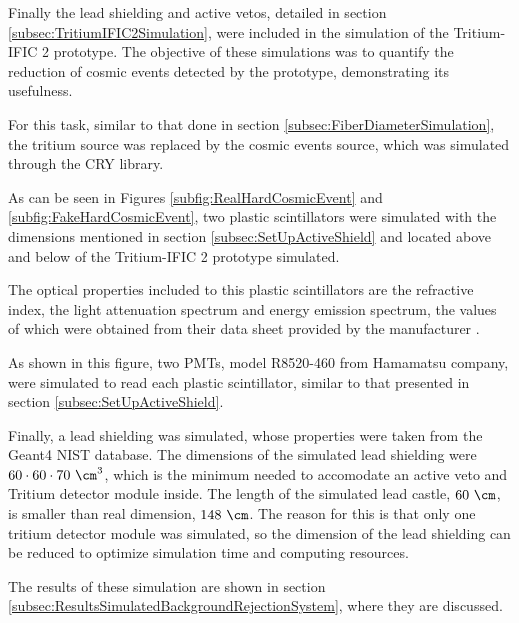 Finally the lead shielding and active vetos, detailed in section \ref{subsec:TritiumIFIC2Simulation}, were included in the simulation of the Tritium-IFIC 2 prototype. The objective of these simulations was to quantify the reduction of cosmic events detected by the prototype, demonstrating its usefulness.

For this task, similar to that done in section \ref{subsec:FiberDiameterSimulation}, the tritium source was replaced by the cosmic events source, which was simulated through the CRY library.

As can be seen in Figures \ref{subfig:RealHardCosmicEvent} and \ref{subfig:FakeHardCosmicEvent}, two plastic scintillators were simulated with the dimensions mentioned in section \ref{subsec:SetUpActiveShield} and located above and below of the Tritium-IFIC 2 prototype simulated. 

The optical properties included to this plastic scintillators are the refractive index, the light attenuation spectrum and energy emission spectrum, the values of which were obtained from their data sheet provided by the manufacturer \cite{ScintillatorVeto}.

As shown in this figure, two PMTs, model R8520-460 from Hamamatsu company, were simulated to read each plastic scintillator, similar to that presented in section \ref{subsec:SetUpActiveShield}.

Finally, a lead shielding was simulated, whose properties were taken from the Geant4 NIST database. The dimensions of the simulated lead shielding were $60 \cdot{} 60 \cdot{} 70~\cm^3$, which is the minimum needed to accomodate an active veto and Tritium detector module inside. The length of the simulated lead castle, $60~\cm$, is smaller than real dimension, $148~\cm$. The reason for this is that only one tritium detector module was simulated, so the dimension of the lead shielding can be reduced to optimize simulation time and computing resources.

The results of these simulation are shown in section \ref{subsec:ResultsSimulatedBackgroundRejectionSystem}, where they are discussed.
